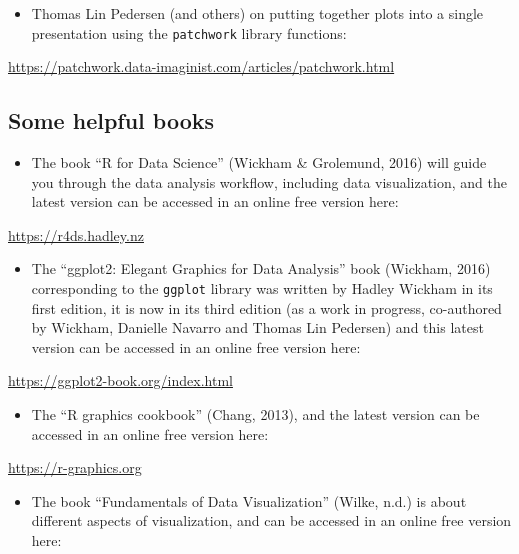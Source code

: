 \documentclass[
  letterpaper,
  DIV=11,
  numbers=noendperiod]{scrreprt}
\providecommand{\tightlist}{%
  \setlength{\itemsep}{0pt}\setlength{\parskip}{0pt}}\usepackage{longtable,booktabs,array}
\begin{document}
\begin{itemize}
\tightlist
\item
  Thomas Lin Pedersen (and others) on putting together plots into a
  single presentation using the \texttt{patchwork} library functions:
\end{itemize}

\url{https://patchwork.data-imaginist.com/articles/patchwork.html}

\hypertarget{some-helpful-books}{%
\subsection{Some helpful books}\label{some-helpful-books}}

\begin{itemize}
\tightlist
\item
  The book ``R for Data Science'' (Wickham \& Grolemund, 2016) will
  guide you through the data analysis workflow, including data
  visualization, and the latest version can be accessed in an online
  free version here:
\end{itemize}

\url{https://r4ds.hadley.nz}

\begin{itemize}
\tightlist
\item
  The ``ggplot2: Elegant Graphics for Data Analysis'' book (Wickham,
  2016) corresponding to the \texttt{ggplot} library was written by
  Hadley Wickham in its first edition, it is now in its third edition
  (as a work in progress, co-authored by Wickham, Danielle Navarro and
  Thomas Lin Pedersen) and this latest version can be accessed in an
  online free version here:
\end{itemize}

\url{https://ggplot2-book.org/index.html}

\begin{itemize}
\tightlist
\item
  The ``R graphics cookbook'' (Chang, 2013), and the latest version can
  be accessed in an online free version here:
\end{itemize}

\url{https://r-graphics.org}

\begin{itemize}
\tightlist
\item
  The book ``Fundamentals of Data Visualization'' (Wilke, n.d.) is about
  different aspects of visualization, and can be accessed in an online
  free version here:
\end{itemize}
\end{document}
